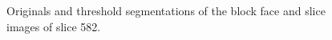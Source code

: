\begin{figure}[htbp]
      \caption{Originals and threshold segmentations of the block face and slice images of slice 582.}
	    \label{fig:582_segmentation}
	  \end{figure}
    
